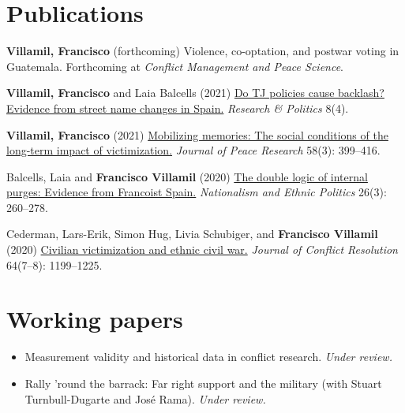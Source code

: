\documentclass[a4paper, 12pt]{article}
\begin{document}
\section*{Publications}

\begin{etaremune}[leftmargin=12pt, itemsep=0pt]
\item \textbf{Villamil, Francisco} (forthcoming) Violence, co-optation, and postwar voting in Guatemala. Forthcoming at \textit{Conflict Management and Peace Science}.
\item \textbf{Villamil, Francisco} and Laia Balcells (2021) \href{https://journals.sagepub.com/doi/full/10.1177/20531680211058550}{Do TJ policies cause backlash? Evidence from street name changes in Spain.} \textit{Research \& Politics} 8(4).
\item \textbf{Villamil, Francisco} (2021) \href{https://doi.org/10.1177/0022343320912816}{Mobilizing memories: The social conditions of the long-term impact of victimization.} \textit{Journal of Peace Research} 58(3): 399--416.
\item Balcells, Laia and \textbf{Francisco Villamil} (2020) \href{https://doi.org/10.1080/13537113.2020.1795451}{The double logic of internal purges: Evidence from Francoist Spain.} \textit{Nationalism and Ethnic Politics} 26(3): 260--278.
\item Cederman, Lars-Erik, Simon Hug, Livia Schubiger, and \textbf{Francisco Villamil} (2020) \href{https://doi.org/10.1177/0022002719898873}{Civilian victimization and ethnic civil war.} \textit{Journal of Conflict Resolution} 64(7--8): 1199--1225.
\end{etaremune}

\section*{Working papers}

\begin{itemize}[leftmargin=*, nolistsep]
\item Measurement validity and historical data in conflict research. \textit{Under review.}
\item Rally 'round the barrack: Far right support and the military (with Stuart Turnbull-Dugarte and José Rama). \textit{Under review.}
\end{itemize}

\end{document}
